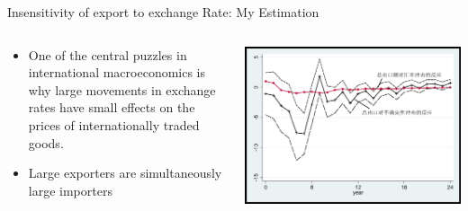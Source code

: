 \documentclass[10pt,hyperref={CJKbookmarks=true},xcolor=dvipsnames,aspectratio=169]{beamer}
\begin{document}
\begin{frame}{Insensitivity of export to exchange Rate: My Estimation}




\begin{columns}[onlytextwidth]
\begin{column}{0.4\textwidth}
\begin{itemize}
\item One of the central puzzles in international macroeconomics is why
large movements in exchange rates have small effects on the prices
of internationally traded goods.
\item Large exporters are simultaneously large importers
\end{itemize}

\end{column}
\begin{column}{0.6\textwidth}
\includegraphics[width=\columnwidth]{fig/boptheory/lec08-37}
\end{column}
\end{columns}

\end{frame}
\end{document}
